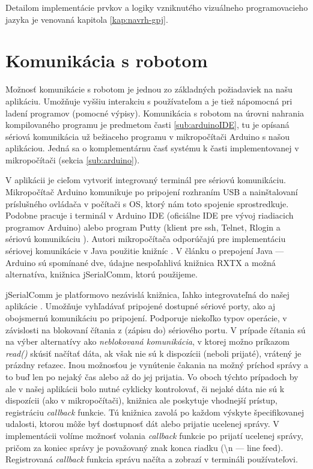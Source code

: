 Detailom implementácie prvkov a logiky vzniknutého vizuálneho programovacieho jazyka je venovaná kapitola \ref{kap:navrh-gpj}.


\newpage

\section{Komunikácia s robotom}
Možnosť komunikácie s robotom je jednou zo základných požiadaviek na našu aplikáciu. Umožňuje vyššiu interakciu s používateľom a je tiež nápomocná pri ladení programov (pomocné výpisy). Komunikácia s robotom na úrovni nahrania kompilovaného programu je predmetom časti \ref{sub:arduinoIDE}, tu je opísaná sériová komunikácia už bežiaceho programu v mikropočítači Arduino s našou aplikáciou. Jedná sa o komplementárnu časť systému k časti implementovanej v mikropočítači (sekcia \ref{sub:arduino}).

V aplikácii je cieľom vytvoriť integrovaný terminál pre sériovú komunikáciu. Mikropočítač Arduino komunikuje po pripojení rozhraním USB a nainštalovaní príslušného ovládača v počítači s OS, ktorý nám toto spojenie sprostredkuje. Podobne pracuje i terminál v Arduino IDE (oficiálne IDE pre vývoj riadiacich programov Arduino) alebo program Putty (klient pre ssh, Telnet, Rlogin a sériovú komunikáciu \cite{putty}). Autori mikropočítača odporúčajú pre implementáciu sériovej komunikácie v Java použitie knižníc \cite{arduinoAndJava}. V článku o prepojení Java --- Arduino sú spomínané dve, údajne nespoľahlivá knižnica RXTX a možná alternatíva, knižnica jSerialComm, ktorú použijeme. 

jSerialComm je platformovo nezávislá knižnica, ľahko integrovateľná do našej aplikácie \cite{jSerialComm}. Umožňuje vyhľadávať pripojené dostupné sériové porty, ako aj obojsmernú komunikáciu po pripojení. Podporuje niekoľko typov operácie, v závislosti na blokovaní čítania z (zápisu do) sériového portu. V prípade čítania sú na výber alternatívy ako \textit{neblokovaná komunikácia}, v ktorej možno príkazom \textit{read()} skúsiť načítať dáta, ak však nie sú k dispozícii (neboli prijaté), vrátený je prázdny reťazec. Inou možnosťou je vynútenie čakania na možný príchod správy a to buď len po nejaký čas alebo až do jej prijatia. Vo oboch týchto prípadoch by ale v našej aplikácii bolo nutné cyklicky kontrolovať, či nejaké dáta nie sú k dispozícii (ako v mikropočítači), knižnica ale poskytuje vhodnejší prístup, registráciu \textit{callback} funkcie. Tú knižnica zavolá po každom výskyte špecifikovanej udalosti, ktorou môže byť dostupnosť dát alebo prijatie ucelenej správy. V implementácii volíme možnosť volania \textit{callback} funkcie po prijatí ucelenej správy, pričom za koniec správy je považovaný znak konca riadku (\textbackslash n --- line feed). Registrovaná \textit{callback} funkcia správu načíta a zobrazí v termináli používateľovi.

